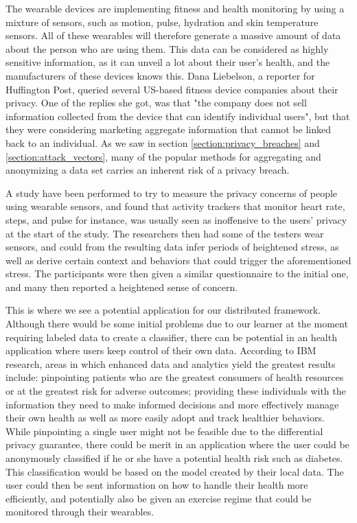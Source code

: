 The wearable devices are implementing fitness and health monitoring by using a mixture of sensors, such as motion, pulse, hydration and skin temperature sensors. All of these wearables will therefore generate a massive amount of data about the person who are using them. This data can be considered as highly sensitive information, as it can unveil a lot about their user's health, and the manufacturers of these devices knows this. Dana Liebelson, a reporter for Huffington Post, queried several US-based fitness device companies about their privacy. One of the replies she got, was that "the company does not sell information collected from the device that can identify individual users", but that they were considering marketing aggregate information that cannot be linked back to an individual\citep{liebelson2014wearables}. As we saw in section \ref{section:privacy_breaches} and \ref{section:attack_vectors}, many of the popular methods for aggregating and anonymizing a data set carries an inherent risk of a privacy breach.

A study \citep{raij2011privacyConcernWearables} have been performed to try to measure the privacy concerns of people using wearable sensors, and found that activity trackers that monitor heart rate, steps, and pulse for instance, was usually seen as inoffensive to the users’ privacy at the start of the study. The researchers then had some of the testers wear sensors, and could from the resulting data infer periods of heightened stress, as well as derive certain context and behaviors that could trigger the aforementioned stress. The participants were then given a similar questionnaire to the initial one, and many then reported a heightened sense of concern. 
  
This is where we see a potential application for our distributed framework. Although there would be some initial problems due to our learner at the moment requiring labeled data to create a classifier, there can be potential in an health application where users keep control of their own data. According to IBM research, areas in which enhanced data and analytics yield the greatest results include: pinpointing patients who are the greatest consumers of health resources or at the greatest risk for adverse outcomes; providing these individuals with the information they need to make informed decisions and more effectively manage their own health as well as more easily adopt and track healthier behaviors\citep{IBM2013reportBigDataHealth}. While pinpointing a single user might not be feasible due to the differential privacy guarantee, there could be merit in an application where the user could be anonymously classified if he or she have a potential health risk such as diabetes. This classification would be based on the model created by their local data. The user could then be sent information on how to handle their health more efficiently, and potentially also be given an exercise regime that could be monitored through their wearables. 

